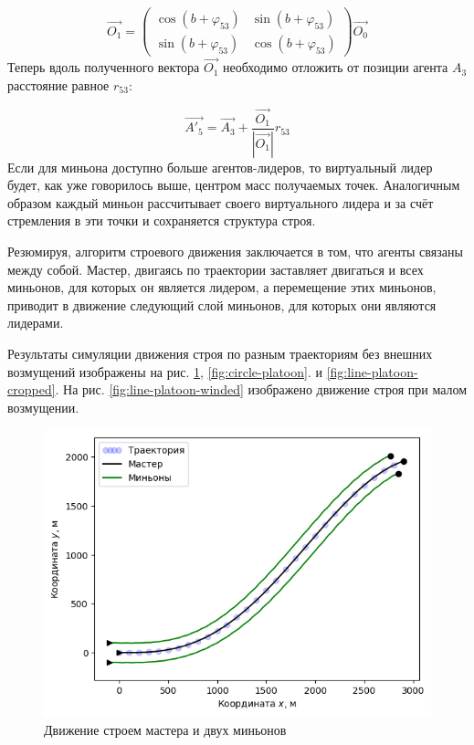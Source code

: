 \documentclass[a4paper, 14pt]{extarticle}
\begin{document}
$$\vec{O_{1}} =  \left(\begin{array}{cc} \cos{(b + \varphi_{53})} & \sin{(b + \varphi_{53})}\\ \sin{(b + \varphi_{53})} & \cos{(b + \varphi_{53})} \end{array}\right) \vec{O_{0}} $$
Теперь вдоль полученного вектора $\vec{O_1}$ необходимо отложить от позиции агента $A_3$ расстояние равное $r_{53}$:\par
$$ \vec{A'_{5}} = \vec{A_3} + \frac{\vec{O_1}}{|\vec{O_1}|} r_{53}$$ 
Если для миньона доступно больше агентов-лидеров, то виртуальный лидер будет, как уже говорилось выше, центром масс получаемых точек. Аналогичным образом каждый миньон рассчитывает своего виртуального лидера и за счёт стремления в эти точки и сохраняется структура строя.\par
Резюмируя, алгоритм строевого движения заключается в том, что агенты связаны между собой. Мастер, двигаясь по траектории заставляет двигаться и всех миньонов, для которых он является лидером, а перемещение этих миньонов, приводит в движение следующий слой миньонов, для которых они являются лидерами. \par
Результаты симуляции движения строя по разным траекториям без внешних возмущений изображены на рис. \ref{fig:platoon-trajectory-0}, \ref{fig:circle-platoon}.  и \ref{fig:line-platoon-cropped}. На рис. \ref{fig:line-platoon-winded} изображено движение строя при малом возмущении.\par
\begin{figure}[!htbp]
	\centering
	\includegraphics[width=0.7\linewidth]{platoon-trajectory-0}
	\caption{Движение строем мастера и двух миньонов}
	\label{fig:platoon-trajectory-0}
\end{figure}
\end{document}
